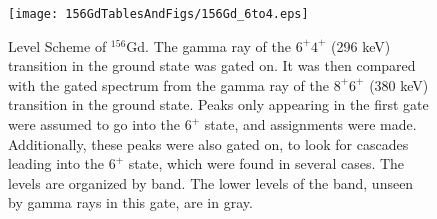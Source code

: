 \begin{landscape}
\begin{figure}
    \centering
    \texttt{[image: 156GdTablesAndFigs/156Gd\_6to4.eps]}
    \caption{Level Scheme of $^{156}$Gd. The gamma ray of the $6^+$\rightarrow$4^+$ (296 keV) transition in the ground state was gated on. It was then compared with the gated spectrum from the gamma ray of the $8^+$\rightarrow$6^+$ (380 keV) transition in the ground state. Peaks only appearing in the first gate were assumed to go into the $6^+$ state, and assignments were made. Additionally, these peaks were also gated on, to look for cascades leading into the $6^+$ state, which were found in several cases. The levels are organized by band. The lower levels of the band, unseen by gamma rays in this gate, are in gray.}
    \label{fig:156_6to4}
\end{figure}
\end{landscape}